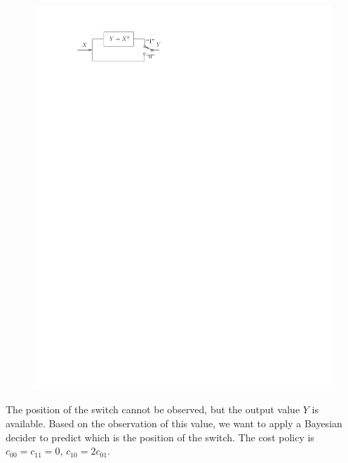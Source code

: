 \begin{figure}[h]
\begin{center}
\includegraphics[width=12cm, trim=0cm 24cm 9cm 2cm]{Figuras/conmutador}
\end{center}
\end{figure}

\vspace{-0.2cm} The position of the switch cannot be observed, but the output value $Y$
is available. Based on the observation of this value, we want to apply
a Bayesian decider to predict which is the position of the switch.
The cost policy is $c_{00}=c_{11}=0$, $c_{10}=2c_{01}$.
 
